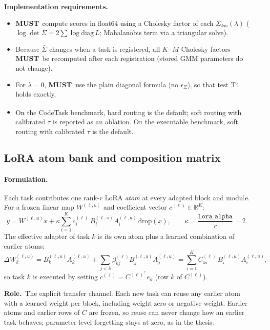 \documentclass[11pt]{article}
\newcommand{\R}{\mathbb{R}}
\newcommand{\T}{^{\top}}
\newcommand{\tagthesis}{\textsuperscript{\textcolor{teal!70!black}{\sffamily[thesis]}}}
\newcommand{\MUST}{\textbf{MUST}}
\newcommand{\role}{\par\noindent\textbf{Role.}\ }
\newcommand{\impl}{\par\noindent\textbf{Implementation requirements.}\ }
\begin{document}
\impl
\begin{itemize}[leftmargin=*]
  \item \MUST\ compute scores in float64 using a Cholesky factor of each $\Sigma_{km}(\lambda)$
        ($\log\det\Sigma=2\sum\log\mathrm{diag}\,L$; Mahalanobis term via a triangular solve).
  \item Because $\bar\Sigma$ changes when a task is registered, all $K\cdot M$ Cholesky factors \MUST\ be
        recomputed after each registration (stored GMM parameters do not change).
  \item For $\lambda=0$, \MUST\ use the plain diagonal formula (no $\epsilon_\Sigma$), so that test T4 holds exactly.
  \item On the CodeTask benchmark, hard routing is the default\tagthesis; soft routing with calibrated $\tau$ is
        reported as an ablation. On the executable benchmark, soft routing with calibrated $\tau$ is the default.
\end{itemize}

\subsection{LoRA atom bank and composition matrix}\label{sec:atoms}

\paragraph{Formulation.} Each task contributes one rank-$r$ LoRA \emph{atom} at every adapted block and module.
For a frozen linear map $W^{(\ell,u)}$ and coefficient vector $c^{(\ell)}\in\R^{K}$:
\begin{equation}
  y=W^{(\ell,u)}x+\kappa\sum_{i=1}^{K}c^{(\ell)}_i\,B_i^{(\ell,u)}A_i^{(\ell,u)}\,\mathrm{drop}(x),\qquad
  \kappa=\frac{\texttt{lora\_alpha}}{r}=2. \label{eq:atombank}
\end{equation}
The effective adapter of task $k$ is its own atom plus a learned combination of earlier atoms:
\begin{equation}
  \Delta W_k^{(\ell,u)}=B_k^{(\ell,u)}A_k^{(\ell,u)}+\sum_{j<k}\beta^{(\ell)}_{kj}B_j^{(\ell,u)}A_j^{(\ell,u)}
  =\sum_{i=1}^{K}C^{(\ell)}_{ki}\,B_i^{(\ell,u)}A_i^{(\ell,u)},
\end{equation}
so task $k$ is executed by setting $c^{(\ell)}=C^{(\ell)\T}e_k$ (row $k$ of $C^{(\ell)}$).

\role The explicit transfer channel. Each new task can reuse any earlier atom with a learned weight per block,
including weight zero or negative weight. Earlier atoms and earlier rows of $C$ are frozen, so reuse can never
change how an earlier task behaves; parameter-level forgetting stays at zero, as in the thesis.
\end{document}
